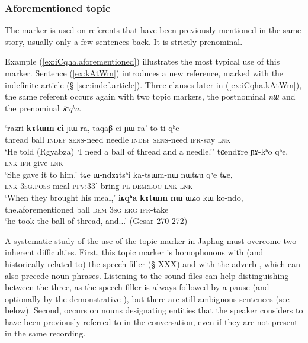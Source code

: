  \subsubsection{Aforementioned topic} \label{sec:iCqha}
 The marker   is used on referents that have been previously mentioned in the same story, usually only a few sentences back. It is strictly prenominal. 
 
Example (\ref{ex:iCqha.aforementioned}) illustrates the most typical use of this marker. Sentence (\ref{ex:kAtWm}) introduces a new reference,  marked with the indefinite article  (§ \ref{sec:indef.article}). Three clauses later in (\ref{ex:iCqha.kAtWm}), the same referent occurs again with two topic markers, the postnominal \textit{nɯ} and the prenominal \textit{iɕqʰa}.
 
 
\begin{exe}
\ex \label{ex:iCqha.aforementioned}
\begin{xlist}
\ex \label{ex:kAtWm}
\gll `razri \textbf{kɤtɯm} \textbf{ci} ɲɯ-ra, taqaβ ci ɲɯ-ra' to-ti qʰe   \\
 thread ball \textsc{indef} \textsc{sens}-need needle \textsc{indef} \textsc{sens}-need \textsc{ifr}-say \textsc{lnk}  \\
\glt `He told (Rgyabza) `I need a ball of thread and a needle.''  
\ex  
\gll tɕendɤre ɲɤ-kʰo qʰe,  \\
\textsc{lnk} \textsc{ifr}-give \textsc{lnk}   \\
\glt `She gave it to him.'
\ex 
\gll  tɕe ɯ-ndzɤtsʰi ka-tsɯm-nɯ nɯtɕu qʰe tɕe,   \\
 \textsc{lnk} \textsc{3sg}.\textsc{poss}-meal \textsc{pfv}:3\fl{}3'-bring-\textsc{pl} \textsc{dem}:\textsc{loc}  \textsc{lnk} \textsc{lnk}    \\
\glt `When they brought his meal,'
\ex \label{ex:iCqha.kAtWm}
\gll   \textbf{iɕqʰa} \textbf{kɤtɯm} \textbf{nɯ} ɯʑo kɯ ko-ndo, \\
   the.aforementioned ball \textsc{dem} \textsc{3sg} \textsc{erg} \textsc{ifr}-take \\
\glt `he took the ball of thread, and...' (Gesar 270-272)
\end{xlist}
\end{exe}
 
 
A systematic study of the use of the topic marker  in Japhug must overcome two inherent difficulties. First, this topic marker is homophonous with (and historically related to) the speech filler  (§ XXX) and with the adverb , which can also precede noun phrases. Listening to the sound files can help distinguishing between the three, as the speech filler is always followed by a pause (and optionally by the demonstrative ), but there are still ambiguous sentences (see below). Second,  occurs on nouns designating entities that the speaker considers to have been previously referred to in the conversation, even if they are not present in the same recording. 

